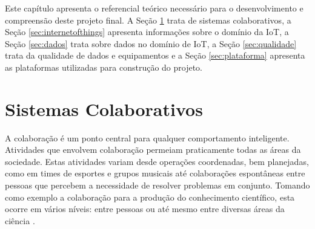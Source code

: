 Este capítulo apresenta o referencial teórico necessário para o desenvolvimento e compreensão deste projeto final. A Seção \ref{sec:siscol} trata de sistemas colaborativos, a Seção \ref{sec:internetofthings} apresenta informações sobre o domínio da \acrfull{IoT}, a Seção \ref{sec:dados} trata sobre dados no domínio de \acrshort{IoT}, a Seção \ref{sec:qualidade} trata da qualidade de dados e equipamentos e a Seção \ref{sec:plataforma} apresenta as plataformas utilizadas para construção do projeto.

\section{Sistemas Colaborativos}
\label{sec:siscol}
\qqad A colaboração é um ponto central para qualquer comportamento inteligente.
Atividades que envolvem colaboração permeiam praticamente todas as áreas da sociedade. Estas atividades variam desde operações coordenadas,
bem planejadas, como em times de esportes e grupos musicais até colaborações espontâneas
entre pessoas que percebem a necessidade de resolver problemas em conjunto.
Tomando como exemplo a colaboração para a produção do conhecimento científico, esta ocorre em vários níveis: entre pessoas ou até mesmo entre diversas áreas da ciência \cite{cbarbara}.

